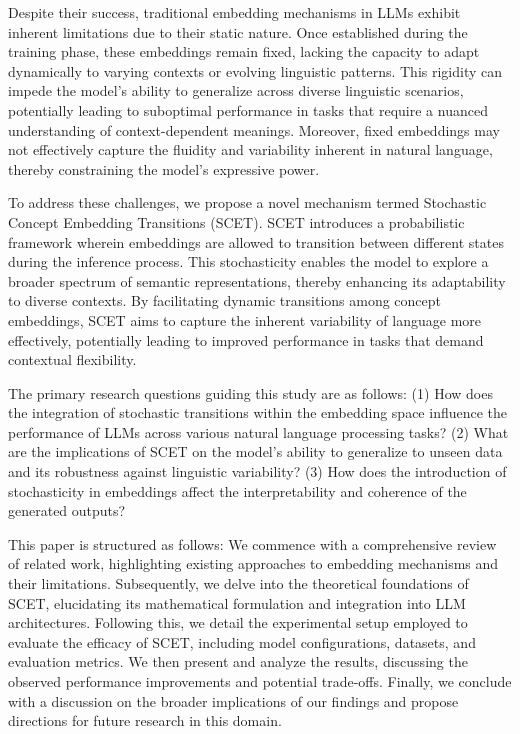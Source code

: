 \documentclass{article}
\begin{document}
Despite their success, traditional embedding mechanisms in LLMs exhibit inherent limitations due to their static nature. Once established during the training phase, these embeddings remain fixed, lacking the capacity to adapt dynamically to varying contexts or evolving linguistic patterns. This rigidity can impede the model's ability to generalize across diverse linguistic scenarios, potentially leading to suboptimal performance in tasks that require a nuanced understanding of context-dependent meanings. Moreover, fixed embeddings may not effectively capture the fluidity and variability inherent in natural language, thereby constraining the model's expressive power.

To address these challenges, we propose a novel mechanism termed Stochastic Concept Embedding Transitions (SCET). SCET introduces a probabilistic framework wherein embeddings are allowed to transition between different states during the inference process. This stochasticity enables the model to explore a broader spectrum of semantic representations, thereby enhancing its adaptability to diverse contexts. By facilitating dynamic transitions among concept embeddings, SCET aims to capture the inherent variability of language more effectively, potentially leading to improved performance in tasks that demand contextual flexibility.

The primary research questions guiding this study are as follows: (1) How does the integration of stochastic transitions within the embedding space influence the performance of LLMs across various natural language processing tasks? (2) What are the implications of SCET on the model's ability to generalize to unseen data and its robustness against linguistic variability? (3) How does the introduction of stochasticity in embeddings affect the interpretability and coherence of the generated outputs?

This paper is structured as follows: We commence with a comprehensive review of related work, highlighting existing approaches to embedding mechanisms and their limitations. Subsequently, we delve into the theoretical foundations of SCET, elucidating its mathematical formulation and integration into LLM architectures. Following this, we detail the experimental setup employed to evaluate the efficacy of SCET, including model configurations, datasets, and evaluation metrics. We then present and analyze the results, discussing the observed performance improvements and potential trade-offs. Finally, we conclude with a discussion on the broader implications of our findings and propose directions for future research in this domain.
\end{document}
